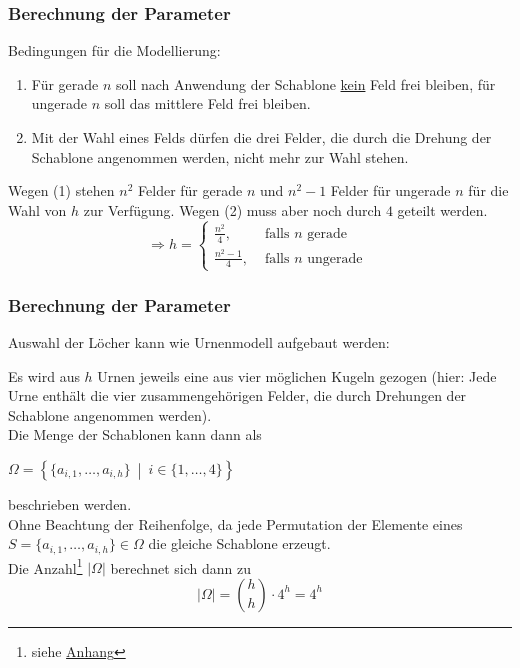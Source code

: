 \documentclass{beamer}
\newcommand{\menge}[2]{\left\{#1\:\middle|\:#2\right\}}
\begin{document}
\begin{frame}\frametitle{Berechnung der Parameter}
Bedingungen für die Modellierung:
\begin{enumerate}
\item Für gerade $n$ soll nach Anwendung der Schablone \underline{kein} Feld frei bleiben, für ungerade $n$ soll das mittlere Feld frei bleiben.%
\item Mit der Wahl eines Felds dürfen die drei Felder, die durch die Drehung der Schablone angenommen werden, nicht mehr zur Wahl stehen.%
\end{enumerate}

Wegen (1) stehen $n^2$ Felder für gerade $n$ und $n^2-1$ Felder für ungerade $n$ für die Wahl von $h$ zur Verfügung. Wegen (2) muss aber noch durch $4$ geteilt werden. %
\[
\Rightarrow h=\begin{cases}
\frac{n^2}{4},&\text{ falls }n \text{ gerade }\\
\frac{n^2-1}{4}, & \text{ falls } n\text{ ungerade }
\end{cases}
\]
\end{frame}

\begin{frame}\frametitle{Berechnung der Parameter}
{\small Auswahl der Löcher kann wie Urnenmodell aufgebaut werden:%
\vspace*{0.2cm}

Es wird aus $h$ Urnen jeweils eine aus vier möglichen Kugeln gezogen (hier: Jede Urne enthält die vier zusammengehörigen Felder, die durch Drehungen der Schablone angenommen werden).%
\\
Die Menge der Schablonen kann dann als\\
\begin{center}
$\Omega=\menge{\{a_{i,1},\dotsc ,a_{i,h}\}}{i\in\{1,\dotsc ,4\}}$
\end{center}
beschrieben werden.%
\\
Ohne Beachtung der Reihenfolge, da jede Permutation der Elemente eines $S=\{a_{i,1},\dotsc ,a_{i,h}\} \in\Omega$ die gleiche Schablone erzeugt.%
\\
Die Anzahl\footnote{\tiny siehe \hyperlink{anhang}{Anhang}}
  $|\Omega|$ berechnet sich dann zu
\[
|\Omega|=\binom{h}{h}\cdot 4^h=4^h
\]}
\end{frame}
\end{document}
